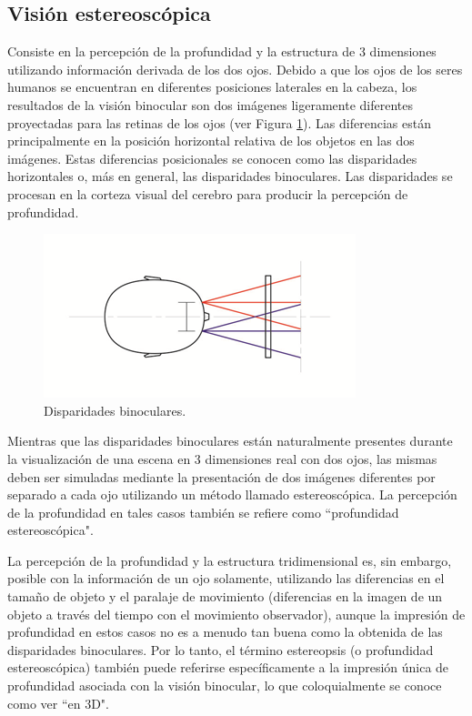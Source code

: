\documentclass[12pt]{article}
\begin{document}
\subsection{Visión estereoscópica}
\noindent Consiste en la percepción de la profundidad y la estructura de 3 dimensiones utilizando información derivada de los dos ojos. Debido a que los ojos de los seres humanos se encuentran en diferentes posiciones laterales en la cabeza, los resultados de la visión binocular son dos imágenes ligeramente diferentes proyectadas para las retinas de los ojos (ver Figura \ref{disparidades}). Las diferencias están principalmente en la posición horizontal relativa de los objetos en las dos imágenes. Estas diferencias posicionales se conocen como las disparidades horizontales o, más en general, las disparidades binoculares. Las disparidades se procesan en la corteza visual del cerebro para producir la percepción de profundidad\cite{visionest}. 
\begin{figure}[h!]
\includegraphics[width =0.7\linewidth, center]{ojos.png}
\caption{Disparidades binoculares.}
\label{disparidades}
\end{figure}

Mientras que las disparidades binoculares están naturalmente presentes durante la visualización de una escena en 3 dimensiones real con dos ojos, las mismas deben ser simuladas mediante la presentación de dos imágenes diferentes por separado a cada ojo utilizando un método llamado estereoscópica. La percepción de la profundidad en tales casos también se refiere como ``profundidad estereoscópica". 

La percepción de la profundidad y la estructura tridimensional  es, sin embargo, posible con la información de un ojo solamente, utilizando las diferencias en el tamaño de objeto y el paralaje de movimiento (diferencias en la imagen de un objeto a través del tiempo con el movimiento observador), aunque la impresión de profundidad en estos casos no es a menudo tan buena como la obtenida de las disparidades binoculares. Por lo tanto, el término estereopsis (o profundidad estereoscópica) también puede referirse específicamente a la impresión única de profundidad asociada con la visión binocular, lo que coloquialmente se conoce como ver ``en 3D".
\end{document}
